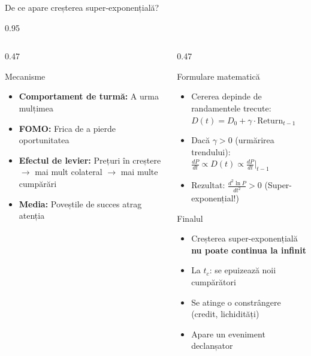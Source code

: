 \documentclass[9pt, aspectratio=169, t]{beamer}
\begin{document}
\begin{frame}{De ce apare creșterea super-exponențială?}
\begin{cminipage}{0.95\textwidth}
{\begin{columns}[T]
\begin{column}{0.47\textwidth}
            \begin{alertblock}{Mecanisme}
                \begin{itemize}\setlength{\itemsep}{0pt}
                    \item \textbf{Comportament de turmă:} A urma mulțimea
                    \item \textbf{FOMO:} Frica de a pierde oportunitatea
                    \item \textbf{Efectul de levier:} Prețuri în creștere $\to$ mai mult colateral $\to$ mai multe cumpărări
                    \item \textbf{Media:} Poveștile de succes atrag atenția
                \end{itemize}
            \end{alertblock}
        \end{column}
        \begin{column}{0.47\textwidth}
            \begin{exampleblock}{Formulare matematică}
                \begin{itemize}\setlength{\itemsep}{1pt}
                    \item Cererea depinde de randamentele trecute: $D(t) = D_0 + \gamma \cdot \text{Return}_{t-1}$
                    \item Dacă $\gamma > 0$ (urmărirea trendului): $\frac{dP}{dt} \propto D(t) \propto \frac{dP}{dt}\big|_{t-1}$
                    \item Rezultat: $\frac{d^2 \ln P}{dt^2} > 0$ (Super-exponențial!)
                \end{itemize}
            \end{exampleblock}

            \begin{block}{Finalul}
                \begin{itemize}\setlength{\itemsep}{0pt}
                    \item Creșterea super-exponențială \textbf{nu poate continua la infinit}
                    \item La $t_c$: se epuizează noii cumpărători
                    \item Se atinge o constrângere (credit, lichidități)
                    \item Apare un eveniment declanșator
                \end{itemize}
            \end{block}
        \end{column}
    \end{columns}
    }
    \end{cminipage}
\end{frame}
\end{document}
